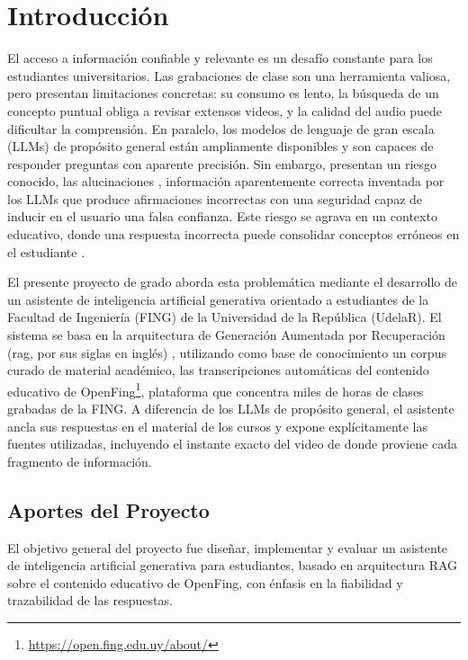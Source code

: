 \chapter{Introducción}
\label{chapter:1-Introducción} 

El acceso a información confiable y relevante es un desafío constante para los estudiantes universitarios. Las grabaciones de clase son una herramienta valiosa, pero presentan limitaciones concretas: su consumo es lento, la búsqueda de un concepto puntual obliga a revisar extensos videos, y la calidad del audio puede dificultar la comprensión. En paralelo, los modelos de lenguaje de gran escala (LLMs) \cite{Zhao2023LLMSurvey} de propósito general están ampliamente disponibles y son capaces de responder preguntas con aparente precisión. Sin embargo, presentan un riesgo conocido, las alucinaciones \cite{ji2023survey}, información aparentemente correcta inventada por los LLMs que produce afirmaciones incorrectas con una seguridad capaz de inducir en el usuario una falsa confianza. Este riesgo se agrava en un contexto educativo, donde una respuesta incorrecta puede consolidar conceptos erróneos en el estudiante \cite{kasneci2023chatgpt}.

El presente proyecto de grado aborda esta problemática mediante el desarrollo de un asistente de inteligencia artificial generativa orientado a estudiantes de la Facultad de Ingeniería (FING) de la Universidad de la República (UdelaR). El sistema se basa en la arquitectura de Generación Aumentada por Recuperación (\acrshort{rag}, por sus siglas en inglés) \cite{lewis2020retrieval}, utilizando como base de conocimiento un corpus curado de material académico, las transcripciones automáticas del contenido educativo de OpenFing\footnote{\url{https://open.fing.edu.uy/about/}}, plataforma que concentra miles de horas de clases grabadas de la FING. A diferencia de los LLMs de propósito general, el asistente ancla sus respuestas en el material de los cursos y expone explícitamente las fuentes utilizadas, incluyendo el instante exacto del video de donde proviene cada fragmento de información.

\section{Aportes del Proyecto}
\label{section:1-Objetivos del Proyecto}

El objetivo general del proyecto fue diseñar, implementar y evaluar un asistente
de inteligencia artificial generativa para estudiantes, basado en
arquitectura RAG sobre el contenido educativo de OpenFing, con énfasis en la
fiabilidad y trazabilidad de las respuestas.

